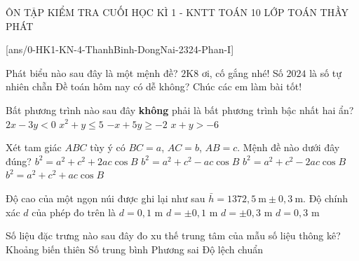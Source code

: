 \begin{name}
	{ÔN TẬP KIỂM TRA CUỐI HỌC KÌ 1 - KNTT}
	{TOÁN 10}
	{LỚP TOÁN THẦY PHÁT}
	{\thoigian}
\end{name}

\caulc
{}[ans/0-HK1-KN-4-ThanhBinh-DongNai-2324-Phan-I]

\begin{ex}%
Phát biểu nào sau đây là một mệnh đề?
\choice
{$2$K$8$ ơi, cố gắng nhé!}
{\True Số $2024$ là số tự nhiên chẵn}
{Đề toán hôm nay có dễ không?}
{Chúc các em làm bài tốt!}
\end{ex}
\begin{ex}%
Bất phương trình nào sau đây \textbf{không} phải là bất phương trình bậc nhất hai ẩn?
\choice
{$2x-3y<0$}
{\True $x^2+y\leq 5$}
{$-x+5y\geq-2$}
{$x+y>-6$}
\end{ex}
\begin{ex}%
Xét tam giác $ABC$ tùy ý có $BC=a$, $AC=b$, $AB=c$. Mệnh đề nào dưới đây đúng?
\choice
{$b^2=a^2+c^2+2ac\cos B$}
{$b^2=a^2+c^2-ac\cos B$}
{\True $b^2=a^2+c^2-2ac\cos B$}
{$b^2=a^2+c^2+ac\cos B$}
\end{ex}
\begin{ex}%
Độ cao của một ngọn núi được ghi lại như sau $\bar{h}=1372{,}5\mathrm{~m} \pm 0{,}3\mathrm{~m}$. Độ chính xác $d$ của phép đo trên là
\choice
{$d=0{,}1$ m}
{$d=\pm 0{,}1$ m}
{$d=\pm 0{,}3$ m}
{\True $d=0{,}3$ m}
\end{ex}
\begin{ex}%
Số liệu đặc trưng nào sau đây đo xu thế trung tâm của mẫu số liệu thông kê?
\choice
{Khoảng biến thiên}
{\True Số trung bình}
{Phương sai}
{Độ lệch chuẩn}
\end{ex}
